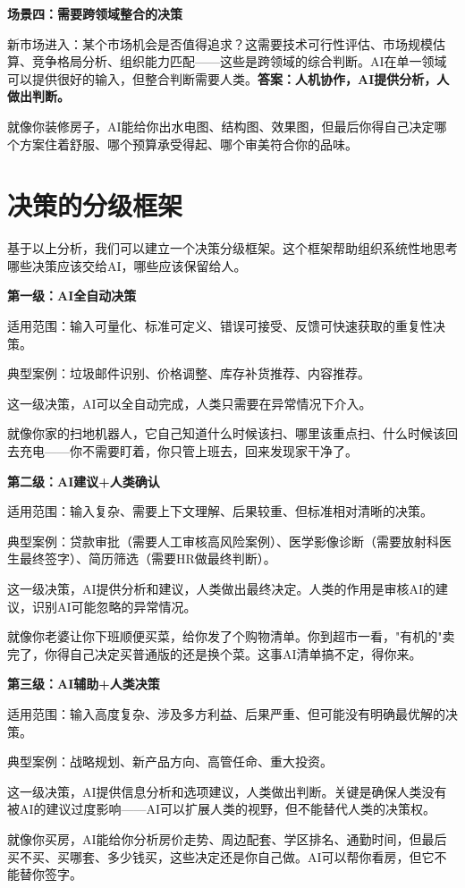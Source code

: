 \textbf{场景四：需要跨领域整合的决策}

新市场进入：某个市场机会是否值得追求？这需要技术可行性评估、市场规模估算、竞争格局分析、组织能力匹配——这些是跨领域的综合判断。AI在单一领域可以提供很好的输入，但整合判断需要人类。\textbf{答案：人机协作，AI提供分析，人做出判断。}

就像你装修房子，AI能给你出水电图、结构图、效果图，但最后你得自己决定哪个方案住着舒服、哪个预算承受得起、哪个审美符合你的品味。

\section{决策的分级框架}


基于以上分析，我们可以建立一个决策分级框架。这个框架帮助组织系统性地思考哪些决策应该交给AI，哪些应该保留给人。

\textbf{第一级：AI全自动决策}

适用范围：输入可量化、标准可定义、错误可接受、反馈可快速获取的重复性决策。

典型案例：垃圾邮件识别、价格调整、库存补货推荐、内容推荐。

这一级决策，AI可以全自动完成，人类只需要在异常情况下介入。

就像你家的扫地机器人，它自己知道什么时候该扫、哪里该重点扫、什么时候该回去充电——你不需要盯着，你只管上班去，回来发现家干净了。

\textbf{第二级：AI建议+人类确认}

适用范围：输入复杂、需要上下文理解、后果较重、但标准相对清晰的决策。

典型案例：贷款审批（需要人工审核高风险案例）、医学影像诊断（需要放射科医生最终签字）、简历筛选（需要HR做最终判断）。

这一级决策，AI提供分析和建议，人类做出最终决定。人类的作用是审核AI的建议，识别AI可能忽略的异常情况。

就像你老婆让你下班顺便买菜，给你发了个购物清单。你到超市一看，"有机的"卖完了，你得自己决定买普通版的还是换个菜。这事AI清单搞不定，得你来。

\textbf{第三级：AI辅助+人类决策}

适用范围：输入高度复杂、涉及多方利益、后果严重、但可能没有明确最优解的决策。

典型案例：战略规划、新产品方向、高管任命、重大投资。

这一级决策，AI提供信息分析和选项建议，人类做出判断。关键是确保人类没有被AI的建议过度影响——AI可以扩展人类的视野，但不能替代人类的决策权。

就像你买房，AI能给你分析房价走势、周边配套、学区排名、通勤时间，但最后买不买、买哪套、多少钱买，这些决定还是你自己做。AI可以帮你看房，但它不能替你签字。


